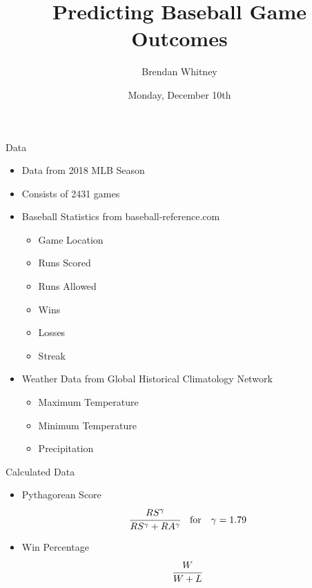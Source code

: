 \documentclass{beamer}
\title{Predicting Baseball Game Outcomes}
\author{Brendan Whitney}
\date{Monday, December 10th}
\begin{document}
\begin{frame}
    \titlepage
\end{frame}

\begin{frame}{Data}
    \begin{itemize}
        \item Data from 2018 MLB Season
        \item Consists of 2431 games
        \item Baseball Statistics from baseball-reference.com
        \begin{itemize}
            \item Game Location
            \item Runs Scored
            \item Runs Allowed
            \item Wins
            \item Losses
            \item Streak
        \end{itemize}
        \item Weather Data from Global Historical Climatology Network
        \begin{itemize}
            \item Maximum Temperature
            \item Minimum Temperature
            \item Precipitation
        \end{itemize}
    \end{itemize}
\end{frame}

\begin{frame}{Calculated Data}
    \begin{itemize}
        \item Pythagorean Score
        \[
            \cfrac{RS^\gamma}
            {RS^\gamma + RA^\gamma}
            \quad
            \text{for}
            \quad
            \gamma = 1.79
        \]
        \item Win Percentage
        \[
            \cfrac{W}{W+L}
        \]
    \end{itemize}
\end{frame}
\end{document}
